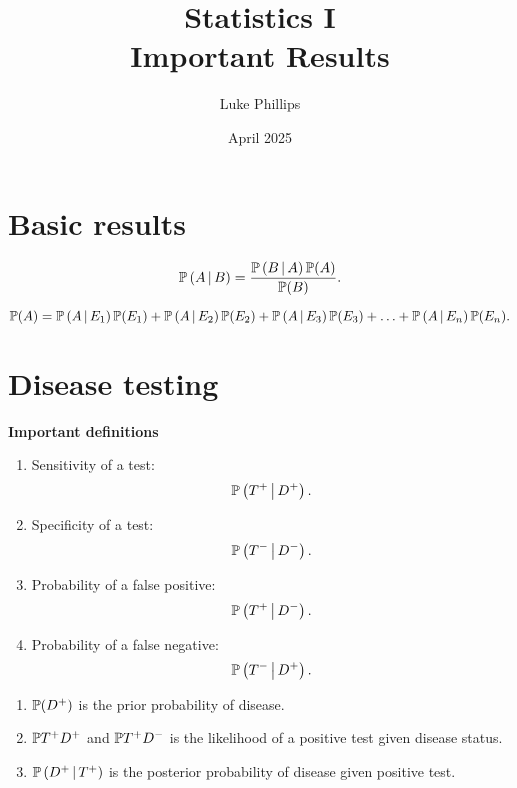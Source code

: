 \documentclass[10pt, a4paper]{article}
\title{Statistics I \\
    \large Important Results}
\author{Luke Phillips}
\date{April 2025}
\begin{document}
\maketitle

\newpage

\tableofcontents

\newpage

\section{Basic results}

\begin{theorem}
    \[
    \cP{A}{B} = \frac{\cP{B}{A}\P(A)}{\P(B)}.
    \]
\end{theorem}

\begin{theorem}
    \[
    \P(A) = \cP{A}{E_1}\P(E_1) + \cP{A}{E_2}\P(E_2) + \cP{A}{E_3}\P(E_3) + \dotsc + \cP{A}{E_n}\P(E_n).
    \]
\end{theorem}

\section{Disease testing}

\textbf{Important definitions}
\begin{enumerate}[label = (\roman*)]
    \item Sensitivity of a test:
    \[
    \cP{T ^ {+}}{D ^ {+}}.
    \]
    
    \item Specificity of a test:
    \[
    \cP{T ^ {-}}{D ^ {-}}.
    \]
    
    \item Probability of a false positive:
    \[
    \cP{T ^ {+}}{D ^ {-}}.
    \]
    
    \item Probability of a false negative:
    \[
    \cP{T ^ {-}}{D ^ {+}}.
    \]
\end{enumerate}

\begin{enumerate}[label = (\roman*)]
    \item $\P(D ^ {+})$ is the prior probability of disease.
    
    \item $\P{T ^ {+}}{D ^ {+}}$ and $\P{T ^ {+}}{D ^ {-}}$ is the likelihood of a positive test given disease status.
    
    \item $\cP{D ^ {+}}{T ^ {+}}$ is the posterior probability of disease given positive test.
\end{enumerate}
\end{document}
